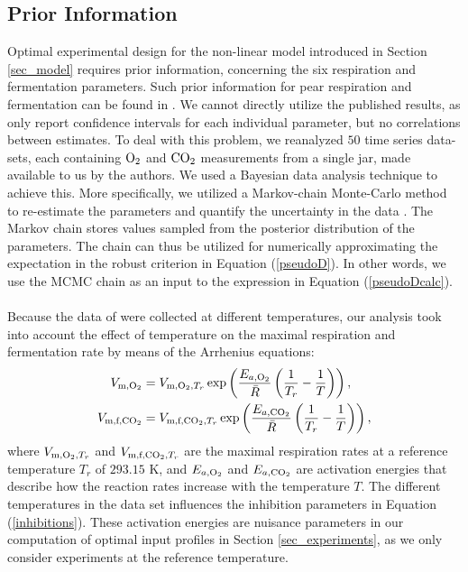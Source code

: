 \subsection{Prior Information}
Optimal experimental design for the non-linear model introduced in Section \ref{sec_model} requires prior information, concerning the six respiration and fermentation parameters. Such prior information for pear respiration and fermentation can be found in \textcite{ho}. We cannot directly utilize the published results, as \textcite{ho} only report confidence intervals for each individual parameter, but no correlations between estimates. To deal with this problem, we reanalyzed $50$ time series data-sets, each containing $\text{O}_2$ and $\text{CO}_2$ measurements from a single jar, made available to us by the authors. We used a Bayesian data analysis technique to achieve this. More specifically, we utilized a Markov-chain Monte-Carlo method to re-estimate the parameters and quantify the uncertainty in the data  \parencite{betancourt}. The Markov chain stores values sampled from the posterior distribution of the parameters. The chain can thus be utilized for numerically approximating the expectation in the robust criterion in Equation (\ref{pseudoD}). In other words, we use the MCMC chain as an input to the expression in Equation (\ref{pseudoDcalc}).
\\
\\
Because the data of \textcite{ho} were collected at different temperatures, our analysis took into account the effect of temperature on the maximal respiration and fermentation rate by means of the Arrhenius equations:
\begin{equation}
\begin{aligned}
V_{\text{m},\text{O}_2} &=
V_{\text{m},\text{O}_2,T_r}\exp\left(\frac{E_{a,\text{O}_2}}{\bar{R}}\left ( \frac{1}{T_r} - \frac{1}{T} \right) \right),\\
V_{\text{m,f,}\text{CO}_2} &= V_{\text{m,f,}\text{CO}_2,T_r}\exp\left(\frac{E_{a,\text{CO}_2}}{\bar{R}}\left (\frac{1}{T_r} - \frac{1}{T} \right)\right),
\end{aligned}
\end{equation}
where $V_{\text{m},\text{O}_2,T_r}$ and $V_{\text{m,f,}\text{CO}_2,T_r}$ are the maximal respiration rates at a reference temperature $T_r$ of $293.15$ K, and $E_{a,\text{O}_2}$ and $E_{a,\text{CO}_2}$ are activation energies that describe how the reaction rates increase with the temperature $T$. {\color{red}The different temperatures in the data set influences the inhibition parameters in Equation (\ref{inhibitions}).} These activation energies are nuisance parameters in our computation of optimal input profiles in Section \ref{sec_experiments}, as we only consider experiments at the reference temperature.
